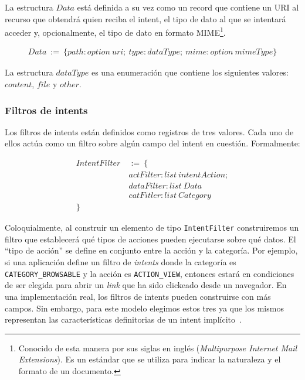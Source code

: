 La estructura $Data$ está definida a su vez como un record que contiene un URI al recurso que
obtendrá quien reciba el intent, el tipo de dato al que se intentará acceder y, opcionalmente, el
tipo de dato en formato MIME\footnote{
    Conocido de esta manera por sus siglas en inglés (\textit{Multipurpose Internet Mail
        Extensions}). Es un estándar que se utiliza para indicar la naturaleza y el formato de un
    documento.
}.

\begin{align*}
    Data\ :=\ \{ path: option\ uri;\ type: dataType;\ mime: option\ mimeType \}
\end{align*}

La estructura $dataType$ es una enumeración que contiene los siguientes valores: $content$, $file$ y
$other$.

\subsubsection*{Filtros de intents}
Los filtros de intents están definidos como registros de tres valores. Cada uno de ellos actúa como
un filtro sobre algún campo del intent en cuestión. Formalmente:

\begin{align*}
    IntentFilter\  & :=\ \{                         \\
                   & actFilter: list\ intentAction; \\
                   & dataFilter: list\ Data         \\
                   & catFitler: list\ Category      \\
    \}
\end{align*}

Coloquialmente, al construir un elemento de tipo \texttt{IntentFilter} construiremos un filtro que
establecerá qué tipos de acciones pueden ejecutarse sobre qué datos. El ``tipo de acción'' se define
en conjunto entre la acción y la categoría. Por ejemplo, si una aplicación define un filtro de
\textit{intents} donde la categoría es \texttt{CATEGORY\_BROWSABLE} y la acción es
\texttt{ACTION\_VIEW}, entonces estará en condiciones de ser elegida para abrir un \textit{link} que
ha sido clickeado desde un navegador. En una implementación real, los filtros de intents pueden
construirse con más campos. Sin embargo, para este modelo elegimos estos tres ya que los mismos
representan las características definitorias de un intent implícito~\cite{android-intents}.

